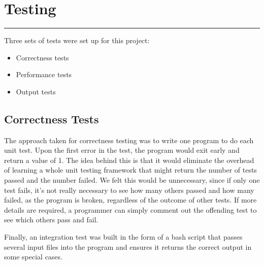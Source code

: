 \section{Testing}
\vspace{-2em}\rule{\textwidth}{1pt}\vspace{1em}

Three sets of tests were set up for this project:
\begin{itemize}
  \item Correctness tests
  \item Performance tests
  \item Output tests
\end{itemize}

\subsection{Correctness Tests}
The approach taken for correctness testing was to write one program to
do each unit test.
Upon the first error in the test, the program would exit early and return
a value of 1.
The idea behind this is that it would eliminate the overhead of learning
a whole unit testing framework that might return the number of tests passed
and the number failed.
We felt this would be unnecessary, since if only one test fails, it's not
really necessary to see how many others passed and how many failed, as the
program is broken, regardless of the outcome of other tests.
If more details are required, a programmer can simply comment out the offending
test to see which others pass and fail.

Finally, an integration test was built in the form of a bash script that
passes several input files into the program and ensures it returns the
correct output in some special cases.


